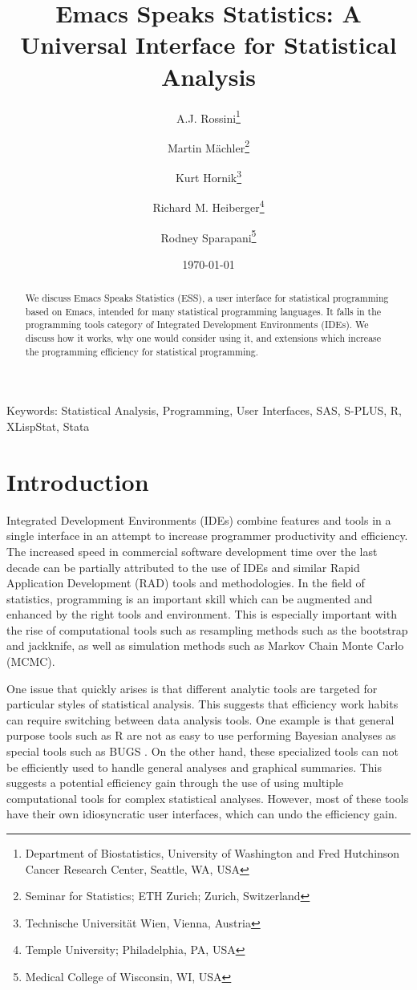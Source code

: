 \documentclass{article}
\title{Emacs Speaks Statistics: A Universal Interface for
  Statistical Analysis}
\author{A.J. Rossini\footnote{Department of Biostatistics, University
    of Washington and Fred Hutchinson Cancer Research Center, Seattle,
    WA, USA} \and Martin M{\"a}chler\footnote{Seminar for Statistics;
    ETH Zurich; Zurich, Switzerland} \and Kurt
  Hornik\footnote{Technische Universit{\"a}t Wien, Vienna, Austria}
  \and Richard M. Heiberger\footnote{Temple University; Philadelphia,
    PA, USA} \and Rodney Sparapani\footnote{Medical College of
    Wisconsin, WI, USA}}
\date{\today}
\newif\ifpdf
\begin{document}
\ifpdf
  \DeclareGraphicsExtensions{.jpg,.pdf,.png,.mps}
\fi


\maketitle

Keywords: Statistical Analysis, Programming, User Interfaces, SAS,
S-PLUS, R, XLispStat, Stata

\begin{abstract}
  We discuss Emacs Speaks Statistics (ESS), a user interface for
  statistical programming based on Emacs, intended for many
  statistical programming languages.  It falls in the programming
  tools category of Integrated Development Environments (IDEs).  We
  discuss how it works, why one would consider using it, and
  extensions which increase the programming efficiency for statistical
  programming.
\end{abstract}

\section{Introduction}
\label{sec:intro}

Integrated Development Environments (IDEs) combine features and tools
in a single interface in an attempt to increase programmer
productivity and efficiency.  The increased speed in commercial
software development time over the last decade can be partially
attributed to the use of IDEs and similar Rapid Application
Development (RAD) tools and methodologies.  In the field of
statistics, programming is an important skill which can be augmented
and enhanced by the right tools and environment.  This is especially
important with the rise of computational tools such as resampling
methods such as the bootstrap and jackknife, as well as simulation
methods such as Markov Chain Monte Carlo (MCMC).

One issue that quickly arises is that different analytic tools are
targeted for particular styles of statistical analysis.  This suggests
that efficiency work habits can require switching between data
analysis tools.  One example is that general purpose tools such as R
\citep{ihak:gent:1996} are not as easy to use performing Bayesian
analyses as special tools such as BUGS \citep{SpieThomBest:1999}.  On
the other hand, these specialized tools can not be efficiently used to
handle general analyses and graphical summaries.  This suggests a
potential efficiency gain through the use of using multiple
computational tools for complex statistical analyses.  However, most
of these tools have their own idiosyncratic user interfaces, which can
undo the efficiency gain.
\end{document}
